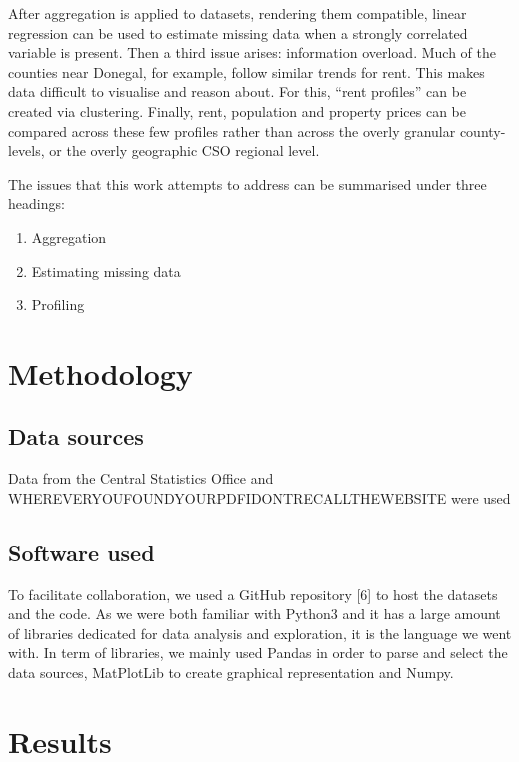 \documentclass[twocolumn]{article}
\begin{document}
After aggregation is applied to datasets, rendering them compatible, linear
regression can be used to estimate missing data when a strongly correlated
variable is present.  Then a third issue arises: information overload.  Much of
the counties near Donegal, for example, follow similar trends for rent.  This
makes data difficult to visualise and reason about.  For this, ``rent
profiles'' can be created via clustering.  Finally, rent, population and
property prices can be compared across these few profiles rather than across
the overly granular county-levels, or the overly geographic CSO regional
level.

The issues that this work attempts to address can be summarised under three headings:
\begin{enumerate}
    \item Aggregation
    \item Estimating missing data
    \item Profiling
\end{enumerate}

\section{Methodology}
\subsection{Data sources}
Data from the Central Statistics Office and
WHEREVERYOUFOUNDYOURPDFIDONTRECALLTHEWEBSITE were used

\subsection{Software used}
To facilitate collaboration, we used a GitHub repository [6] to host the datasets and the code. As we were both familiar with Python3 and it has a large amount of libraries dedicated for data analysis and exploration, it is the language we went with. In term of libraries, we mainly used Pandas in order to parse and select the data sources, MatPlotLib to create graphical representation and Numpy.

\section{Results}
\end{document}
